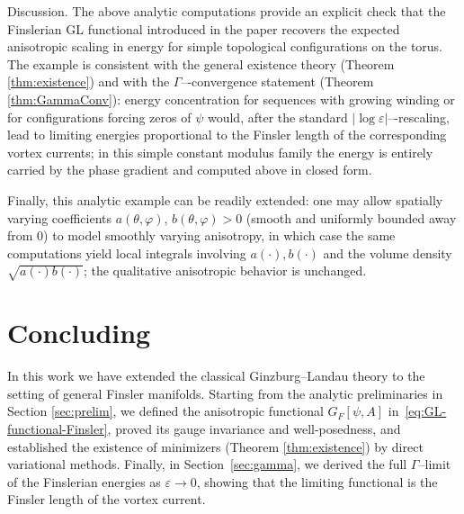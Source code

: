 \documentclass[fleqn,11pt,twoside]{article}
\theoremstyle{definition}
\begin{document}
Discussion. The above analytic computations provide an explicit check that the Finslerian GL functional introduced in the paper recovers the expected anisotropic scaling in energy for simple topological configurations on the torus. The example is consistent with the general existence theory (Theorem \ref{thm:existence}) and with the $\Gamma$–-convergence statement (Theorem \ref{thm:GammaConv}): energy concentration for sequences with growing winding or for configurations forcing zeros of $\psi$ would, after the standard $|\log\varepsilon|$–-rescaling, lead to limiting energies proportional to the Finsler length of the corresponding vortex currents; in this simple constant modulus family the energy is entirely carried by the phase gradient and computed above in closed form.

Finally, this analytic example can be readily extended: one may allow spatially varying coefficients $a(\theta,\varphi),\,b(\theta,\varphi)>0$ (smooth and uniformly bounded away from $0$) to model smoothly varying anisotropy, in which case the same computations yield local integrals involving $a(\cdot),b(\cdot)$ and the volume density $\sqrt{a(\cdot)b(\cdot)}$; the qualitative anisotropic behavior is unchanged.

\section{Concluding}\label{sec:conclusion}
In this work we have extended the classical Ginzburg--Landau theory to the setting of general Finsler manifolds.
Starting from the analytic preliminaries in 
Section \ref{sec:prelim}, we defined the anisotropic functional
$G_F[\psi,A]$ in~\eqref{eq:GL-functional-Finsler},
proved its gauge invariance and well-posedness,
and established the existence of minimizers
(Theorem \ref{thm:existence}) by direct variational methods.
Finally, in Section~\ref{sec:gamma}, we derived the full
$\Gamma$--limit of the Finslerian energies as $\varepsilon\to 0$,
showing that the limiting functional is the Finsler length of the vortex current.
\end{document}
